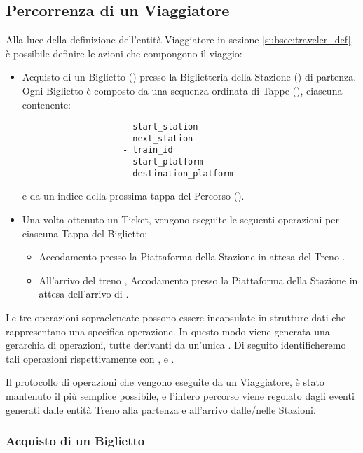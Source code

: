 \subsection{Percorrenza di un Viaggiatore}
	
	Alla luce della definizione dell'entità Viaggiatore in sezione \ref{subsec:traveler_def}, è possibile definire le azioni che compongono il viaggio:
		\begin{itemize}
			\item Acquisto di un Biglietto () presso la Biglietteria della Stazione () di partenza. Ogni Biglietto è composto da una sequenza ordinata di Tappe (), ciascuna contenente:
				\begin{verbatim}
					- start_station
					- next_station
					- train_id 
					- start_platform 
					- destination_platform
				\end{verbatim}
			e da un indice della prossima tappa del Percorso ().
			\item Una volta ottenuto un Ticket, vengono eseguite le seguenti operazioni per ciascuna Tappa del Biglietto:
				\begin{itemize}
					\item Accodamento presso la Piattaforma  della Stazione  in attesa del Treno .
					\item All'arrivo del treno , Accodamento presso la Piattaforma  della Stazione  in attesa dell'arrivo di . 
				\end{itemize}
		\end{itemize} 
	Le tre operazioni sopraelencate possono essere incapsulate in strutture dati che rappresentano una specifica operazione. In questo modo viene generata una gerarchia di operazioni, tutte derivanti da un'unica . Di seguito identificheremo tali operazioni rispettivamente con ,  e .
	
	Il protocollo di operazioni che vengono eseguite da un Viaggiatore, è stato mantenuto il più semplice possibile, e l'intero percorso viene regolato dagli eventi generati dalle entità Treno alla partenza e all'arrivo dalle/nelle Stazioni. 
	
	\subsubsection{Acquisto di un Biglietto}
	

